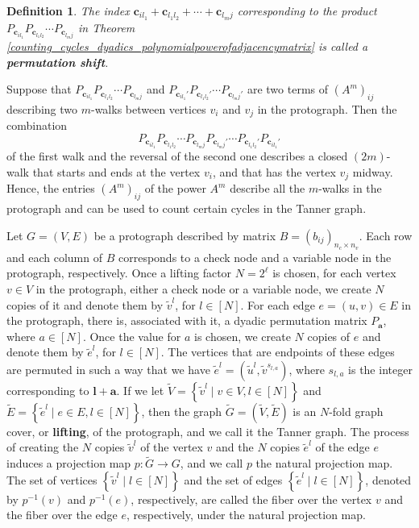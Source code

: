 \documentclass[11pt]{article}
\newtheorem{definition}[lemma]{Definition}
\theoremstyle{plain}
\theoremstyle{plain}
\theoremstyle{definition}
\numberwithin{theo}{section}
\newcommand{\ba}{{\mathbf a}}
\newcommand{\bc}{{\mathbf c}}
\newcommand{\bl}{{\mathbf l}}
\newcounter{alp}
\begin{document}
{\begin{definition}
\label{counting_cycles_dyadics_permutationshift}
The index $\bc_{il_1}+\bc_{l_1l_2}+\cdots+\bc_{l_mj}$ corresponding to the product $P_{\bc_{il_1}}P_{\bc_{l_1l_2}}\cdots P_{\bc_{l_mj}}$ in Theorem \ref{counting_cycles_dyadics_polynomialpowerofadjacencymatrix} is called a \textbf{permutation shift}. 
\end{definition}

Suppose that $P_{\bc_{il_1}}P_{\bc_{l_1l_2}}\cdots P_{\bc_{l_mj}}$ and $P_{\bc_{il_1}'}P_{\bc_{l_1l_2}'}\cdots P_{\bc_{l_mj}'}$ are two terms of ${(A^m)}_{ij}$ describing two $m$-walks between vertices $v_i$ and $v_j$ in the protograph. Then the combination
\begin{equation*}
P_{\bc_{il_1}}P_{\bc_{l_1l_2}}\cdots P_{\bc_{l_mj}}P_{\bc_{l_mj}'}\cdots P_{\bc_{l_1l_2}'}P_{\bc_{il_1}'}
\end{equation*}
of the first walk and the reversal of the second one describes a closed $(2m)$-walk that starts and ends at the vertex $v_i$, and that has the vertex $v_j$ midway. Hence, the entries ${(A^m)}_{ij}$ of the power $A^m$ describe all the $m$-walks in the protograph and can be used to count certain cycles in the Tanner graph.

Let $G=(V,E)$ be a protograph described by matrix $B={(b_{ij})}_{n_c\times n_v}$. Each row and each column of $B$ corresponds to a check node and a variable node in the protograph, respectively. Once a lifting factor $N=2^\ell$ is chosen, for each vertex $v\in V$ in the protograph, either a check node or a variable node, we create $N$ copies of it and denote them by $\tilde{v}^l$, for $l\in[N]$. For each edge $e=(u,v)\in E$ in the protograph, there is, associated with it, a dyadic permutation matrix $P_\ba$, where $a\in[N]$. Once the value for $a$ is chosen, we create $N$ copies of $e$ and denote them by $\tilde{e}^l$, for $l\in[N]$. The vertices that are endpoints of these edges are permuted in such a way that we have $\tilde{e}^l=(\tilde{u}^l,\tilde{v}^{s_{l,a}})$, where $s_{l,a}$ is the integer corresponding to $\bl+\ba$. 
If we let $\tilde{V}=\left\{\tilde{v}^l \mid v\in V, l\in[N] \right\}$ and $\tilde{E}=\left\{\tilde{e}^l \mid e\in E, l\in[N] \right\}$, then the graph $\tilde{G}=(\tilde{V},\tilde{E})$ is an $N$-fold graph cover, or \textbf{lifting}, of the protograph, and we call it the Tanner graph. The process of creating the $N$ copies $\tilde{v}^l$ of the vertex $v$ and the $N$ copies $\tilde{e}^l$ of the edge $e$ induces a projection map $p:\tilde{G}\rightarrow G$, and we call $p$ the natural projection map. The set of vertices $\left\{\tilde{v}^l \mid l\in[N] \right\}$ and the set of edges $\left\{\tilde{e}^l \mid l\in[N] \right\}$, denoted by $p^{-1}(v)$ and $p^{-1}(e)$, respectively, are called the fiber over the vertex $v$ and the fiber over the edge $e$, respectively, under the natural projection map.

}
\end{document}
